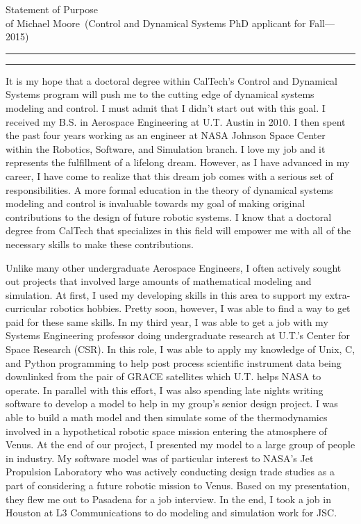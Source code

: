 \documentclass{article}
\newcommand{\soptitle}{Statement of Purpose}
\newcommand{\yourname}{Michael Moore}
\begin{document}
\begin{center}\LARGE\soptitle\\
\large of \yourname\ (Control and Dynamical Systems PhD applicant for Fall---2015)
\end{center}

\hrule
\vspace{1pt}
\hrule height 1pt

\bigskip

It is my hope that a doctoral degree within CalTech's Control and Dynamical Systems program will push me
to the cutting edge of dynamical systems modeling and control. I must admit that I didn't start out with this goal. I received my B.S. in Aerospace Engineering at U.T. Austin in 2010. I then spent the past four years working as 
an engineer at NASA Johnson Space Center within the Robotics, Software, and Simulation branch. I love my job
and it represents the fulfillment of a lifelong dream. However, as I have advanced in
my career, I have come to realize that this dream job comes with a serious set of responsibilities.
A more formal education in the theory of dynamical systems modeling and control is invaluable towards my goal of making original contributions to the design of future robotic systems. I know that a doctoral degree from CalTech that specializes in this field will empower me with all of the necessary skills to make these contributions.

Unlike many other undergraduate Aerospace Engineers, I often actively sought out projects that involved
large amounts of mathematical modeling and simulation. At first, I used my developing skills in this area to support my extra-curricular robotics hobbies. Pretty soon, however, I was able to find a way to get paid for these same skills. In my third year, I was able to get a job with my Systems Engineering professor doing undergraduate research at U.T.'s Center for Space Research (CSR). In this role, I was able to apply my knowledge of Unix, C, and Python programming to help post process scientific instrument data being downlinked
from the pair of GRACE satellites which U.T. helps NASA to operate. In parallel with this effort,
I was also spending late nights writing software to develop a model to help in my group's senior design project.
I was able to build a math model and then simulate some of the thermodynamics involved in a hypothetical
robotic space mission entering the atmosphere of Venus. At the end of our project, I presented my model to a
large group of people in industry. My software model was of particular interest to NASA's Jet Propulsion
Laboratory who was actively conducting design trade studies as a part of considering a future robotic 
mission to Venus. Based on my presentation, they flew me out to Pasadena for a job interview. In the end,
I took a job in Houston at L3 Communications to do modeling and simulation work for JSC. 
\end{document}
